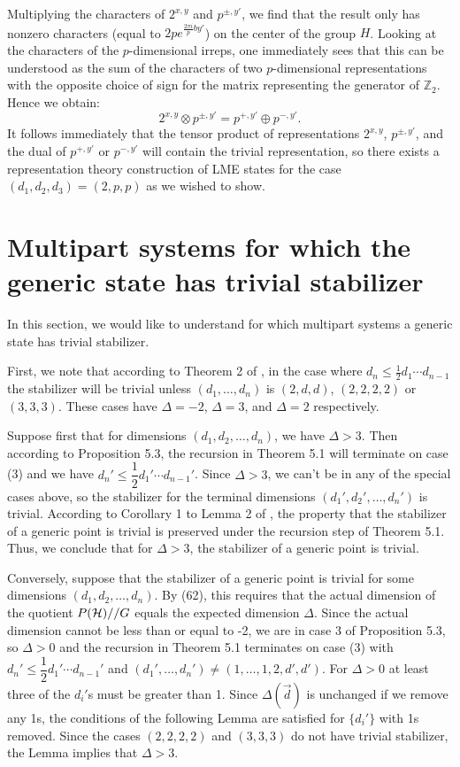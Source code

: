 \documentclass[12pt]{article}
\theoremstyle{definition}
\begin{document}
Multiplying the characters of $2^{x,y}$ and $p^{\pm,y'}$, we find that the result only has nonzero characters (equal to $2pe^{\frac{2 \pi i}{p} b y'}$) on the center of the group $H$. Looking at the characters of the $p$-dimensional irreps, one immediately sees that this can be understood as the sum of the characters of two $p$-dimensional representations with the opposite choice of sign for the matrix representing the generator of $\mathbb{Z}_2$. Hence we obtain:
\begin{equation}
2^{x,y}  \otimes p^{\pm,y'} = p^{+,y'} \oplus p^{-,y'}.
\label{singletensorpdt}
\end{equation}
It follows immediately that the tensor product of representations $2^{x,y}$, $p^{\pm,y'}$, and the dual of $p^{+,y'}$ or $p^{-,y'}$ will contain the trivial representation, so there exists a representation theory construction of LME states for the case $(d_1,d_2,d_3) = (2,p,p)$ as we wished to show.

\section{Multipart systems for which the generic state has trivial stabilizer}

In this section, we would like to understand for which multipart systems a generic state has trivial stabilizer. 

First, we note that according to Theorem 2 of \cite{ampopov}, in the case where $d_n \le \frac{1}{2} d_1 \cdots d_{n-1}$ the stabilizer will be trivial unless $(d_1, \dots, d_n)$ is $(2,d,d)$, $(2,2,2,2)$ or $(3,3,3)$. These cases have $\Delta = -2$, $\Delta = 3$, and $\Delta = 2$ respectively.

Suppose first that for dimensions $(d_1,d_2, \dots, d_n)$, we have $\Delta > 3$. Then according to Proposition 5.3, the recursion in Theorem 5.1 will terminate on case (3) and we have $d_n' \le \dfrac{1}{2} d_1' \cdots d_{n-1}'$. Since $\Delta > 3$, we can't be in any of the special cases above, so the stabilizer for the terminal dimensions $(d_1',d_2', \dots, d_n')$ is trivial. According to Corollary 1 to Lemma 2 of \cite{elashvili}, the property that the stabilizer of a generic point is trivial is preserved under the recursion step of Theorem 5.1. Thus, we conclude that for $\Delta > 3$, the stabilizer of a generic point is trivial.

Conversely, suppose that the stabilizer of a generic point is trivial for some dimensions $(d_1,d_2, \dots, d_n)$. By (62), this requires that the actual dimension of the quotient $P({\cal H})//G$ equals the expected dimension $\Delta$. Since the actual dimension cannot be less than or equal to -2, we are in case 3 of Proposition 5.3, so $\Delta > 0$ and the recursion in Theorem 5.1 terminates on case (3) with $d_n' \le \dfrac{1}{2} d_1' \cdots d_{n-1}'$  and $(d_1', \dots, d_n') \ne (1,\dots,1,2,d',d')$. For $\Delta > 0$ at least three of the $d_i'$s must be greater than 1. Since $\Delta(\vec{d})$ is unchanged if we remove any 1s, the conditions of the following Lemma are satisfied for $\{ d_i' \}$ with 1s removed. Since the cases $(2,2,2,2)$ and $(3,3,3)$ do not have trivial stabilizer, the Lemma implies that $\Delta > 3$.
\end{document}
